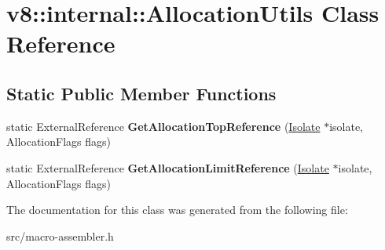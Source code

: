 \hypertarget{classv8_1_1internal_1_1_allocation_utils}{}\section{v8\+:\+:internal\+:\+:Allocation\+Utils Class Reference}
\label{classv8_1_1internal_1_1_allocation_utils}
\subsection*{Static Public Member Functions}
\begin{DoxyCompactItemize}
\item 
\hypertarget{classv8_1_1internal_1_1_allocation_utils_a5aea70b8a44c214a3638c585c4a342d1}{}static External\+Reference {\bfseries Get\+Allocation\+Top\+Reference} (\hyperlink{classv8_1_1internal_1_1_isolate}{Isolate} $\ast$isolate, Allocation\+Flags flags)\label{classv8_1_1internal_1_1_allocation_utils_a5aea70b8a44c214a3638c585c4a342d1}

\item 
\hypertarget{classv8_1_1internal_1_1_allocation_utils_a6a4322d4278ca1f666fdcee2c9eecfca}{}static External\+Reference {\bfseries Get\+Allocation\+Limit\+Reference} (\hyperlink{classv8_1_1internal_1_1_isolate}{Isolate} $\ast$isolate, Allocation\+Flags flags)\label{classv8_1_1internal_1_1_allocation_utils_a6a4322d4278ca1f666fdcee2c9eecfca}

\end{DoxyCompactItemize}


The documentation for this class was generated from the following file\+:\begin{DoxyCompactItemize}
\item 
src/macro-\/assembler.\+h\end{DoxyCompactItemize}
